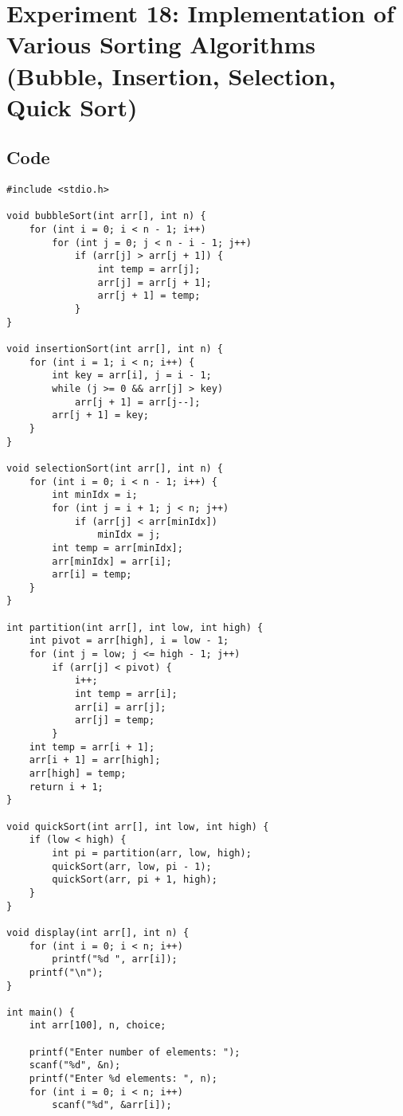 \documentclass[12pt,a4paper]{article}
\begin{document}
\newpage
\section*{Experiment 18: Implementation of Various Sorting Algorithms (Bubble, Insertion, Selection, Quick Sort)}

\subsection*{Code}
\begin{lstlisting}
#include <stdio.h>

void bubbleSort(int arr[], int n) {
    for (int i = 0; i < n - 1; i++)
        for (int j = 0; j < n - i - 1; j++)
            if (arr[j] > arr[j + 1]) {
                int temp = arr[j];
                arr[j] = arr[j + 1];
                arr[j + 1] = temp;
            }
}

void insertionSort(int arr[], int n) {
    for (int i = 1; i < n; i++) {
        int key = arr[i], j = i - 1;
        while (j >= 0 && arr[j] > key)
            arr[j + 1] = arr[j--];
        arr[j + 1] = key;
    }
}

void selectionSort(int arr[], int n) {
    for (int i = 0; i < n - 1; i++) {
        int minIdx = i;
        for (int j = i + 1; j < n; j++)
            if (arr[j] < arr[minIdx])
                minIdx = j;
        int temp = arr[minIdx];
        arr[minIdx] = arr[i];
        arr[i] = temp;
    }
}

int partition(int arr[], int low, int high) {
    int pivot = arr[high], i = low - 1;
    for (int j = low; j <= high - 1; j++)
        if (arr[j] < pivot) {
            i++;
            int temp = arr[i];
            arr[i] = arr[j];
            arr[j] = temp;
        }
    int temp = arr[i + 1];
    arr[i + 1] = arr[high];
    arr[high] = temp;
    return i + 1;
}

void quickSort(int arr[], int low, int high) {
    if (low < high) {
        int pi = partition(arr, low, high);
        quickSort(arr, low, pi - 1);
        quickSort(arr, pi + 1, high);
    }
}

void display(int arr[], int n) {
    for (int i = 0; i < n; i++)
        printf("%d ", arr[i]);
    printf("\n");
}

int main() {
    int arr[100], n, choice;

    printf("Enter number of elements: ");
    scanf("%d", &n);
    printf("Enter %d elements: ", n);
    for (int i = 0; i < n; i++)
        scanf("%d", &arr[i]);


\end{lstlisting}
\end{document}

